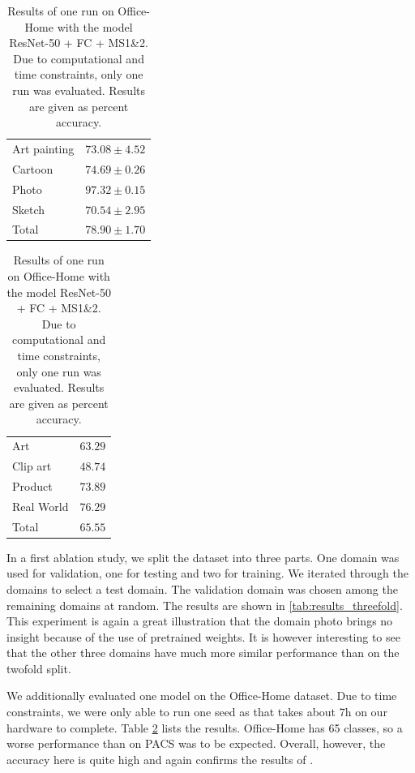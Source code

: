 \begin{table}[t]
    \centering
    \begin{minipage}[t]{0.48\textwidth}
        \centering
        \caption{Results of an ablation study on a threefold split of PACS into train, validation and test set. Results are given as mean $\pm$ standard deviation of percent accuracy. The model used was ResNet-50 + FC + MS1\&2 + FR1.}
        \label{tab:results_threefold}
        \vspace{.5em}
        \begin{tabular}{l | c}
            \toprule
            Art painting & $73.08 \pm 4.52$ \\
            Cartoon & $74.69 \pm 0.26$ \\
            Photo & $97.32 \pm 0.15$ \\
            Sketch & $70.54 \pm 2.95$ \\
            \midrule
            Total & $78.90 \pm 1.70$ \\
            \bottomrule
        \end{tabular}
    \end{minipage}
    \hfill
    \begin{minipage}[t]{0.48\textwidth}
        \centering
        \caption{Results of one run on Office-Home with the model ResNet-50 + FC + MS1\&2. Due to computational and time constraints, only one run was evaluated. Results are given as percent accuracy.}
        \label{tab:results_office-home}
        \vspace{.5em}
        \begin{tabular}{l | c}
            \toprule
            Art & $63.29$ \\
            Clip art & $48.74$ \\
            Product & $73.89$ \\
            Real World & $76.29$ \\
            \midrule
            Total & $65.55$ \\
            \bottomrule
        \end{tabular}
    \end{minipage}
\end{table}

In a first ablation study, we split the dataset into three parts. One domain was used for validation, one for testing and two for training. We iterated through the domains to select a test domain. The validation domain was chosen among the remaining domains at random. The results are shown in \ref{tab:results_threefold}. This experiment is again a great illustration that the domain photo brings no insight because of the use of pretrained weights. It is however interesting to see that the other three domains have much more similar performance than on the twofold split.

We additionally evaluated one model on the Office-Home dataset. Due to time constraints, we were only able to run one seed as that takes about 7h on our hardware to complete. Table \ref{tab:results_office-home} lists the results. Office-Home has 65 classes, so a worse performance than on PACS was to be expected. Overall, however, the accuracy here is quite high and again confirms the results of \cite{zhouMixStyleNeuralNetworks2023}.
